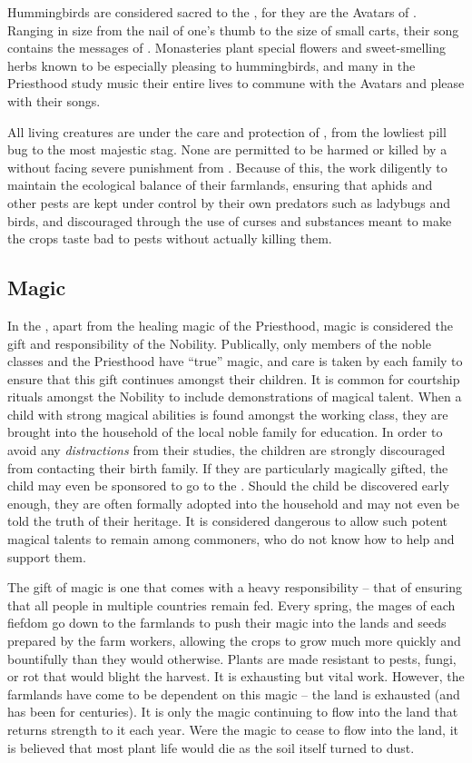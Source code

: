 \documentclass[blue]{GL2020}
\begin{document}
Hummingbirds are considered sacred to the \pFarmers{}, for they are the Avatars of \cFarmGod{}.  Ranging in size from the nail of one's thumb to the size of small carts, their song contains the messages of \cFarmGod{}.  Monasteries plant special flowers and sweet-smelling herbs known to be especially pleasing to hummingbirds, and many in the Priesthood study music their entire lives to commune with the Avatars and please \cFarmGod{} with their songs.

All living creatures are under the care and protection of \cFarmGod{}, from the lowliest pill bug to the most majestic stag.  None are permitted to be harmed or killed by a \pFarmer{} without facing severe punishment from \cFarmGod{}.  Because of this, the \pFarm{} work diligently to maintain the ecological balance of their farmlands, ensuring that aphids and other pests are kept under control by their own predators such as ladybugs and birds, and discouraged through the use of curses and substances meant to make the crops taste bad to pests without actually killing them. 

\subsection*{Magic}
In the \pFarm{}, apart from the healing magic of the Priesthood, magic is considered the gift and responsibility of the Nobility.  Publically, only members of the noble classes and the Priesthood have ``true'' magic, and care is taken by each family to ensure that this gift continues amongst their children.  It is common for courtship rituals amongst the Nobility to include demonstrations of magical talent.  When a child with strong magical abilities is found amongst the working class, they are brought into the household of the local noble family for education.  In order to avoid any \emph{distractions} from their studies, the children are strongly discouraged from contacting their birth family.  If they are particularly magically gifted, the child may even be sponsored to go to the \pSchool{}.  Should the child be discovered early enough, they are often formally adopted into the household and may not even be told the truth of their heritage.  It is considered dangerous to allow such potent magical talents to remain among commoners, who do not know how to help and support them.  

The gift of magic is one that comes with a heavy responsibility – that of ensuring that all people in multiple countries remain fed.  Every spring, the mages of each fiefdom go down to the farmlands to push their magic into the lands and seeds prepared by the farm workers, allowing the crops to grow much more quickly and bountifully than they would otherwise.  Plants are made resistant to pests, fungi, or rot that would blight the harvest.  It is exhausting but vital work.  However, the farmlands have come to be dependent on this magic -- the land is exhausted (and has been for centuries).  It is only the magic continuing to flow into the land that returns strength to it each year.  Were the magic to cease to flow into the land, it is believed that most plant life would die as the soil itself turned to dust.
\end{document}
